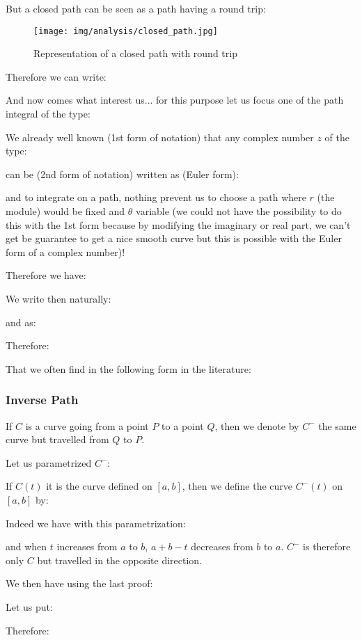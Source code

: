 	But a closed path can be seen as a path having a round trip:
	\begin{figure}[H]
		\begin{center}
			\texttt{[image: img/analysis/closed\_path.jpg]}
		\end{center}	
		\caption{Representation of a closed path with round trip}
	\end{figure}
	Therefore we can write:
	
	And now comes what interest us... for this purpose let us focus one  of the path integral of the type:
	
	We already well known (1st form of notation) that any complex number $z$ of the type:
	
	can be (2nd form of notation) written as (Euler form):
	
	and to integrate on a path, nothing prevent us to choose a path where $r$ (the module) would be fixed and $\theta$ variable (we could not have the possibility to do this with the 1st form because by modifying the imaginary or real part, we can't get be guarantee to get a nice smooth curve but this is possible with the Euler form of a complex number)!
	
	Therefore we have:
	
	We write then naturally:
	
	and as:
	
	Therefore:
	
	That we often find in the following form in the literature:
	
	
	
	\subsubsection{Inverse Path}
	If $C$ is a curve going from a point $P$ to a point $Q$, then we denote by $C^-$  the same curve but travelled from $Q$ to $P$.
	
	Let us parametrized $C^-$:
	
	If $C(t)$ it is the curve defined on $[a, b]$, then we define the curve $C^-(t)$ on $[a, b]$ by:
	
	Indeed we have with this parametrization:
	
	and when $t$ increases from $a$ to $b$, $a + b - t$ decreases from $b$ to $a$. $C^-$ is therefore only $C$ but travelled in the opposite direction.
	
	We then have using the last proof:
	
	Let us put:
	
	Therefore:
	
